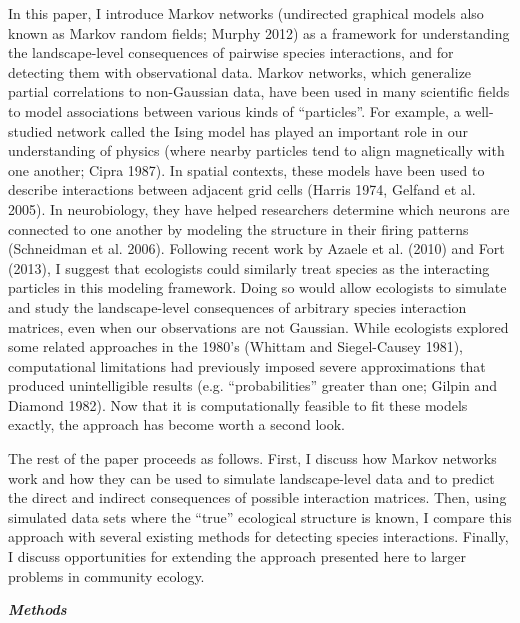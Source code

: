 \documentclass[12pt,]{article}
\begin{document}
\begin{spacing}{1.9}
\begin{flushleft}
In this paper, I introduce Markov networks (undirected graphical models
also known as Markov random fields; Murphy 2012) as a framework for
understanding the landscape-level consequences of pairwise species
interactions, and for detecting them with observational data. Markov
networks, which generalize partial correlations to non-Gaussian data,
have been used in many scientific fields to model associations between
various kinds of ``particles''. For example, a well-studied network
called the Ising model has played an important role in our understanding
of physics (where nearby particles tend to align magnetically with one
another; Cipra 1987). In spatial contexts, these models have been used
to describe interactions between adjacent grid cells (Harris 1974,
Gelfand et al. 2005). In neurobiology, they have helped researchers
determine which neurons are connected to one another by modeling the
structure in their firing patterns (Schneidman et al. 2006). Following
recent work by Azaele et al. (2010) and Fort (2013), I suggest that
ecologists could similarly treat species as the interacting particles in
this modeling framework. Doing so would allow ecologists to simulate and
study the landscape-level consequences of arbitrary species interaction
matrices, even when our observations are not Gaussian. While ecologists
explored some related approaches in the 1980's (Whittam and
Siegel-Causey 1981), computational limitations had previously imposed
severe approximations that produced unintelligible results (e.g.
``probabilities'' greater than one; Gilpin and Diamond 1982). Now that
it is computationally feasible to fit these models exactly, the approach
has become worth a second look.

The rest of the paper proceeds as follows. First, I discuss how Markov
networks work and how they can be used to simulate landscape-level data
and to predict the direct and indirect consequences of possible
interaction matrices. Then, using simulated data sets where the ``true''
ecological structure is known, I compare this approach with several
existing methods for detecting species interactions. Finally, I discuss
opportunities for extending the approach presented here to larger
problems in community ecology.

\textbf{\emph{Methods}}


\end{flushleft}
\end{spacing}
\end{document}

